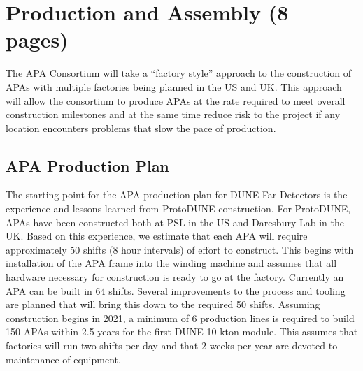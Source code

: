 \section{Production and Assembly (8 pages)}
\label{sec:fdsp-apa-prod-assy}

The APA Consortium will take a ``factory style'' approach to the construction of APAs with multiple factories being planned in the US and UK. %
This approach will allow the consortium to produce APAs at the rate required to meet overall construction milestones and at the same time reduce risk to the project if any location encounters problems that slow the pace of production.

\subsection{APA Production Plan}
\label{sec:fdsp-apa-prod-plan}


The starting point for the APA production plan for DUNE Far Detectors is the experience and lessons learned from ProtoDUNE construction. For ProtoDUNE, APAs have been constructed both at PSL in the US and Daresbury Lab in the UK.  Based on this experience, we estimate that each APA will require approximately 50 shifts (8 hour intervals) of effort to construct. This begins with installation of the APA frame into the winding machine and assumes that all hardware necessary for construction is ready to go at the factory. %
Currently an APA can be built in 64 shifts. Several improvements to the process and tooling are planned that will bring this down to the required 50 shifts. Assuming construction begins in 2021, a minimum of 6 production lines is required to build 150 APAs within 2.5 years for the first DUNE 10-kton module. This assumes that factories will run two shifts per day and that 2 weeks per year are devoted to maintenance of equipment. 

